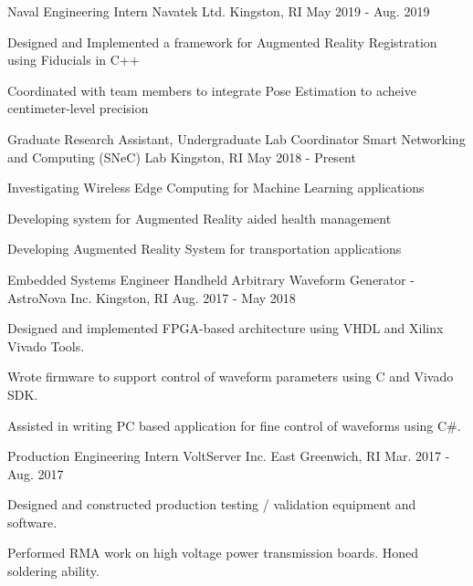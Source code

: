 \begin{cventries}
   \cventry
     {Naval Engineering Intern}
     {Navatek Ltd.}
     {Kingston, RI}
     {May 2019 - Aug. 2019}
     {
       \begin{cvitems}
        \item{Designed and Implemented a framework for Augmented Reality Registration using Fiducials in C++}
        \item{Coordinated with team members to integrate Pose Estimation to acheive centimeter-level precision}
       \end{cvitems}
     }
  \cventry
    {Graduate Research Assistant, Undergraduate Lab Coordinator}
    {Smart Networking and Computing (SNeC) Lab}
    {Kingston, RI}
    {May 2018 - Present}
    {
      \begin{cvitems} 
        \item{Investigating Wireless Edge Computing for Machine Learning applications}
        \item{Developing system for Augmented Reality aided health management}
        \item{Developing Augmented Reality System for transportation applications} 
      \end{cvitems}
    }
    
  \cventry
    {Embedded Systems Engineer}
    {Handheld Arbitrary Waveform Generator - AstroNova Inc.}
    {Kingston, RI}
    {Aug. 2017 - May 2018}
    {
      \begin{cvitems}
        \item {Designed and implemented FPGA-based architecture using VHDL and Xilinx Vivado Tools.}
        \item {Wrote firmware to support control of waveform parameters using C and Vivado SDK.}
        \item {Assisted in writing PC based application for fine control of waveforms using C\#.}
      \end{cvitems}
    }
  \cventry
    {Production Engineering Intern}
    {VoltServer Inc.}
    {East Greenwich, RI}
    {Mar. 2017 - Aug. 2017}
    {
      \begin{cvitems}
        \item {Designed and constructed production testing / validation equipment and software.}
        \item {Performed RMA work on high voltage power transmission boards. Honed soldering ability.}
      \end{cvitems}
    }
 \end{cventries}

